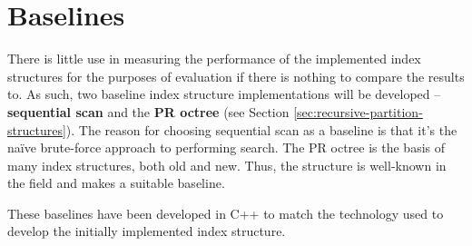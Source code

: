 \begin{table}
	\centering
	\caption{Operation Lists Used for Main Evaluation}
	\label{tab:operation-lists}
\end{table}

\section{Baselines}
\label{sec:baselines}

There is little use in measuring the performance of the implemented index structures for the purposes of evaluation if there is nothing to compare the results to. As such, two baseline index structure implementations will be developed -- \textbf{sequential scan} and the \textbf{PR octree} (see Section \ref{sec:recursive-partition-structures}). The reason for choosing sequential scan as a baseline is that it's the na\"{i}ve brute-force approach to performing search. The PR octree is the basis of many index structures, both old and new. Thus, the structure is well-known in the field and makes a suitable baseline.

These baselines have been developed in C++ to match the technology used to develop the initially implemented index structure.

